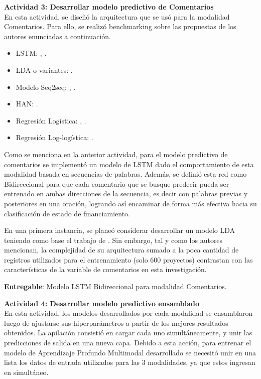 \textbf{Actividad 3: Desarrollar modelo predictivo de Comentarios}
\\
En esta actividad, se diseñó la arquitectura que se usó para la modalidad Comentarios. Para ello, se realizó benchmarking sobre las propuestas de los autores enunciadas a continuación.

\begin{itemize}
	\item LSTM: \cite{pr_jin2019dayssuccess}, \cite{pr_shafqat2019topicpredictions}.
	\item LDA o variantes: \cite{pr_shafqat2019topicpredictions}.
	\item Modelo Seq2seq: \cite{pr_lee2018contentDL}, \cite{pr_jin2019dayssuccess}.
	\item HAN: \citeauthor{pr_lee2018contentDL}.
	\item Regresión Logística: \cite{pr_li2016predcrowd}, \cite{pr_kaur2017socmedcrowd}.
	\item Regresión Log-logística: \cite{pr_li2016predcrowd}.
\end{itemize}

Como se menciona en la anterior actividad, para el modelo predictivo de comentarios se implementó un modelo de LSTM dado el comportamiento de esta modalidad basada en secuencias de palabras. Además, se definió esta red como Bidireccional para que cada comentario que se busque predecir pueda ser entrenado en ambas direcciones de la secuencia, es decir con palabras previas y posteriores en una oración, logrando así encaminar de forma más efectiva hacia su clasificación de estado de financiamiento.

En una primera instancia, se planeó considerar desarrollar un modelo LDA teniendo como base el trabajo de \cite{pr_shafqat2019topicpredictions}. Sin embargo, tal y como los autores mencionan, la complejidad de su arquitectura sumado a la poca cantidad de registros utilizados para el entrenamiento (solo 600 proyectos) contrastan con las características de la variable de comentarios en esta investigación.

\textbf{Entregable}: Modelo LSTM Bidireccional para modalidad Comentarios.

\textbf{Actividad 4: Desarrollar modelo predictivo ensamblado}
\\
En esta actividad, los modelos desarrollados por cada modalidad se ensamblaron luego de ajustarse sus hiperparámetros a partir de los mejores resultados obtenidos. La apilación consistió en cargar cada uno simultáneamente, y unir las predicciones de salida en una nueva capa. Debido a esta acción, para entrenar el modelo de Aprendizaje Profundo Multimodal desarrollado se necesitó unir en una lista los datos de entrada utilizados para las 3 modalidades, ya que estos ingresan en simultáneo.

